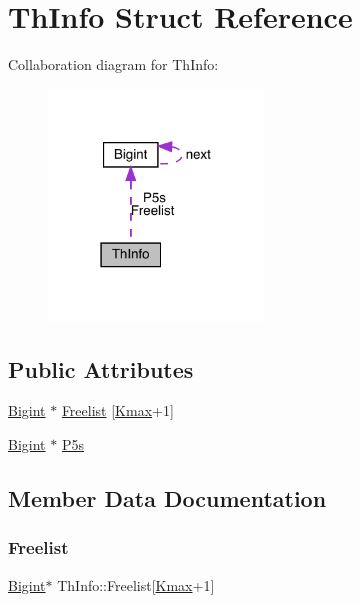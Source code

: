 \hypertarget{struct_th_info}{}\section{Th\+Info Struct Reference}
\label{struct_th_info}


Collaboration diagram for Th\+Info\+:
\nopagebreak
\begin{figure}[H]
\begin{center}
\leavevmode
\includegraphics[width=162pt]{struct_th_info__coll__graph}
\end{center}
\end{figure}
\subsection*{Public Attributes}
\begin{DoxyCompactItemize}
\item 
\hyperlink{struct_bigint}{Bigint} $\ast$ \hyperlink{struct_th_info_aa01cbd438821e9e091020ebbf1ecd210}{Freelist} \mbox{[}\hyperlink{dtoa_8c_a60a2b72a9437564147596c3308b55845}{Kmax}+1\mbox{]}
\item 
\hyperlink{struct_bigint}{Bigint} $\ast$ \hyperlink{struct_th_info_a0c079d4c3cf2296a7d6b7b2a1d80d841}{P5s}
\end{DoxyCompactItemize}


\subsection{Member Data Documentation}
\mbox{\label{struct_th_info_aa01cbd438821e9e091020ebbf1ecd210}} 
\subsubsection{\texorpdfstring{Freelist}{Freelist}}
{\footnotesize\ttfamily \hyperlink{struct_bigint}{Bigint}$\ast$ Th\+Info\+::\+Freelist\mbox{[}\hyperlink{dtoa_8c_a60a2b72a9437564147596c3308b55845}{Kmax}+1\mbox{]}}

